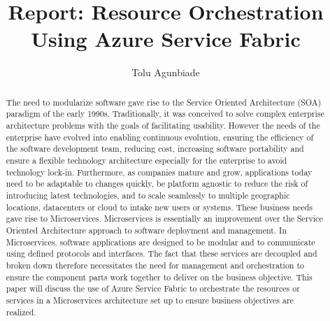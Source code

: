 
\title{Report: Resource Orchestration Using Azure Service Fabric }


\author{Tolu Agunbiade}


\renewcommand{\shortauthors}{G. v. Laszewski}


\begin{abstract}
The need to modularize software gave rise to the Service Oriented
Architecture (SOA) paradigm of the early 1990s. Traditionally, 
it was
conceived to solve complex enterprise architecture problems with the
goals of facilitating usability. However the needs of the enterprise
have evolved into enabling continuous evolution, ensuring the
efficiency of the software development team, reducing cost, increasing
software portability and ensure a flexible technology architecture
especially for the enterprise to avoid technology
lock-in. Furthermore, as companies mature and grow, applications today
need to be adaptable to changes quickly, be platform agnostic to
reduce the risk of introducing latest technologies, and to scale
seamlessly to multiple geographic locations, datacenters or cloud to
intake new users or systems. These business needs gave rise to
Microservices. Microservices is essentially an improvement over 
the Service
Oriented Architecture approach to software deployment and management.
In Microservices, software applications are
designed to be modular and to communicate using defined protocols
and interfaces. The fact that these 
services are decoupled
and broken down therefore necessitates the need for management and
orchestration to ensure the component parts work together to deliver
on the business objective. This paper will discuss the use of Azure
Service Fabric to orchestrate the resources or services in a
Microservices architecture set up to ensure business objectives are
realized.

\end{abstract}



\maketitle


